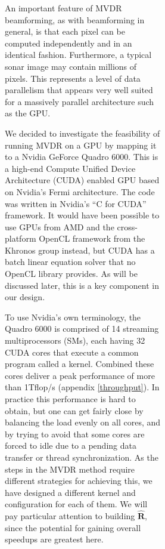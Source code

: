 \documentclass[12pt,journal,draftclsnofoot,onecolumn]{IEEEtran}
\newcommand\mat[1]{\boldsymbol{#1}}
\newcommand\1{\vec 1}
\newcommand*\eR{\mat{\hat R}}
\begin{document}
\begin{figure}[H]
\begin{figure}[!t]
\begin{figure}[!t]

An important feature of MVDR beamforming, as with beamforming in general, is that each pixel can be computed independently and in an identical fashion. Furthermore, a typical sonar image may contain millions of pixels. This represents a level of data parallelism that appears very well suited for a massively parallel architecture such as the GPU.

We decided to investigate the feasibility of running MVDR on a GPU by mapping it to a Nvidia GeForce Quadro 6000. This is a high-end Compute Unified Device Architecture (CUDA) enabled GPU based on Nvidia's Fermi architecture. The code was written in Nvidia's ``C for CUDA'' framework. It would have been possible to use GPUs from AMD and the cross-platform OpenCL framework from the Khronos group instead, but CUDA has a batch linear equation solver that no OpenCL library provides. As will be discussed later, this is a key component in our design.

To use Nvidia's own terminology, the Quadro 6000 is comprised of 14 streaming multiprocessors (SMs), each having 32 CUDA cores that execute a common program called a kernel. Combined these cores deliver a peak performance of more than 1\;Tflop/s (appendix \ref{throughput}). In practice this performance is hard to obtain, but one can get fairly close by balancing the load evenly on all cores, and by trying to avoid that some cores are forced to idle due to a pending data transfer or thread synchronization. As the steps in the MVDR method require different strategies for achieving this, we have designed a different kernel and configuration for each of them. We will pay particular attention to building $\eR$, since the potential for gaining overall speedups are greatest here.



\end{figure}
\end{figure}
\end{figure}
\end{document}
